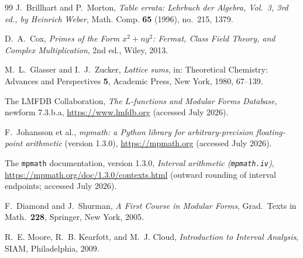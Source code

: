 \documentclass[11pt]{article}
\theoremstyle{definition}
\theoremstyle{remark}
\begin{document}
\begin{thebibliography}{99}
J.~Brillhart and P.~Morton,
\emph{Table errata: Lehrbuch der Algebra, Vol.~3, 3rd ed., by Heinrich
Weber}, Math. Comp. \textbf{65} (1996), no.~215, 1379.

D.~A.~Cox,
\emph{Primes of the Form $x^2+ny^2$: Fermat, Class Field Theory, and
Complex Multiplication}, 2nd ed., Wiley, 2013.

M.~L.~Glasser and I.~J.~Zucker,
\emph{Lattice sums}, in: Theoretical Chemistry: Advances and Perspectives
\textbf{5}, Academic Press, New York, 1980, 67--139.

The LMFDB Collaboration,
\emph{The $L$-functions and Modular Forms Database},
newform \textsf{7.3.b.a}, \url{https://www.lmfdb.org}
(accessed July 2026).

F.~Johansson et al.,
\emph{mpmath: a Python library for arbitrary-precision floating-point
arithmetic} (version 1.3.0), \url{https://mpmath.org}
(accessed July 2026).

The \texttt{mpmath} documentation, version 1.3.0,
\emph{Interval arithmetic (\texttt{mpmath.iv})},
\url{https://mpmath.org/doc/1.3.0/contexts.html}
(outward rounding of interval endpoints; accessed July 2026).

F.~Diamond and J.~Shurman,
\emph{A First Course in Modular Forms},
Grad.\ Texts in Math.\ \textbf{228}, Springer, New York, 2005.

R.~E. Moore, R.~B. Kearfott, and M.~J. Cloud,
\emph{Introduction to Interval Analysis},
SIAM, Philadelphia, 2009.

\end{thebibliography}
\end{document}
